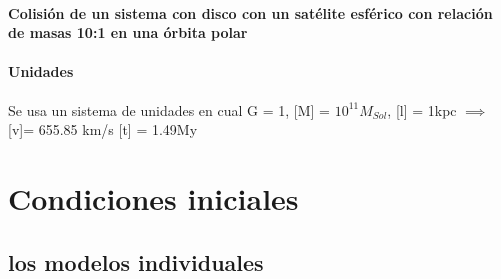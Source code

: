 \documentclass[12pt]{article} %
\renewcommand{\=}[1]{\stackrel{#1}{=}} %
\theoremstyle{definition}
\theoremstyle{remark}
\begin{document}
\paragraph{Colisión de un sistema con disco con un satélite esférico con relación de masas 10:1 en una órbita polar}
\paragraph{Unidades}
Se usa un sistema de unidades en cual G = 1, [M] = $10^{11} M_{Sol}$, [l] = 1kpc $\implies$ [v]= 655.85 km/s [t] = 1.49My
\section*{Condiciones iniciales}


\subsection*{los modelos individuales}
\end{document}
